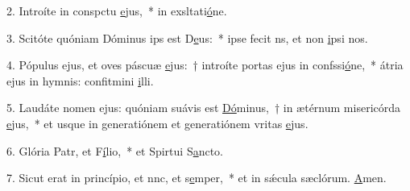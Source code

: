 2. Introíte in conspctu \uline{e}jus,~* in exsltati\uline{ó}ne.\par 
3. Scitóte quóniam Dóminus ips est D\uline{e}us:~* ipse fecit ns, et non \uline{i}psi nos.\par 
4. Pópulus ejus, et oves páscuæ \uline{e}jus:~† introíte portas ejus in confssi\uline{ó}ne,~* átria ejus in hymnis: confitmini \uline{i}lli.\par 
5. Laudáte nomen ejus: quóniam suávis est \uline{Dó}minus,~† in ætérnum misericórda \uline{e}jus,~* et usque in generatiónem et generatiónem vritas \uline{e}jus.\par 
6. Glória Patr, et F\uline{í}lio,~* et Spirtui S\uline{a}ncto.\par 
7. Sicut erat in princípio, et nnc, et s\uline{e}mper,~* et in sǽcula sæclórum. \uline{A}men.\par 
